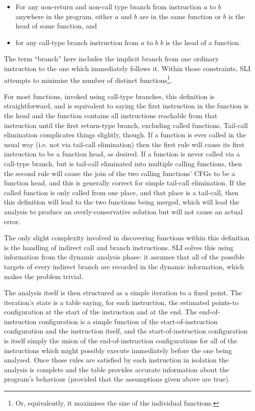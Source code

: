 \begin{itemize}
\item
  For any non-return and non-call type branch from instruction $a$ to
  $b$ anywhere in the program, either $a$ and $b$ are in the same
  function or $b$ is the head of some function, and
\item
  for any call-type branch instruction from $a$ to $b$ $b$ is the head
  of a function.
\end{itemize}

The term ``branch'' here includes the implicit branch
from one ordinary instruction to the one which immediately follows it.
Within those constraints, SLI attempts to minimise the number of
distinct functions\footnote{Or, equivalently, it maximises the size of
  the individual functions.}.

For most functions, invoked using call-type branches, this definition
is straightforward, and is equivalent to saying the first instruction
in the function is the head and the function contains all instructions
reachable from that instruction until the first return-type branch,
excluding called functions.  Tail-call elimination complicates things
slightly, though.  If a function is ever called in the usual way
(i.e. not via tail-call elimination) then the first rule will cause
its first instruction to be a function head, as desired.  If a
function is never called via a call-type branch, but is tail-call
eliminated into multiple calling functions, then the second rule will
cause the join of the two calling functions' CFGs to be a function
head, and this is generally correct for simple tail-call elimination.
If the called function is only called from one place, and that place
is a tail-call, then this definition will lead to the two functions
being merged, which will lead the analysis to produce an
overly-conservative solution but will not cause an actual error.

The only slight complexity involved in discovering functions within
this definition is the handling of indirect call and branch
instructions.  SLI solves this using information from the dynamic
analysis phase: it assumes that all of the possible targets of every
indirect branch are recorded in the dynamic information, which makes
the problem trivial.

The analysis itself is then structured as a simple iteration to a
fixed point.  The iteration's state is a table saying, for each
instruction, the estimated points-to configuration at the start of the
instruction and at the end.  The end-of-instruction configuration is a
simple function of the start-of-instruction configuration and the
instruction itself, and the start-of-instruction configuration is
itself simply the union of the end-of-instruction configurations for
all of the instructions which might possibly execute immediately
before the one being analysed.  Once those rules are satisfied by each
instruction in isolation the analysis is complete and the table
provides accurate information about the program's behaviour (provided
that the assumptions given above are true).

